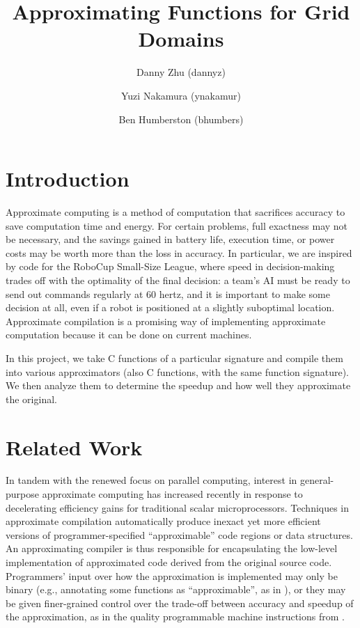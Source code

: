 \documentclass{article}
\begin{document}
\title{Approximating Functions for Grid Domains}
\author{Danny Zhu (dannyz) \and Yuzi Nakamura (ynakamur) \and Ben Humberston (bhumbers)}

\maketitle

\section{Introduction}

Approximate computing is a method of computation that sacrifices accuracy to save computation time and energy. For certain problems, full exactness may not be necessary, and the savings gained in battery life, execution time, or power costs may be worth more than the loss in accuracy. In particular, we are inspired by code for the RoboCup Small-Size League, where speed in decision-making trades off with the optimality of the final decision: a team's AI must be ready to send out commands regularly at 60 hertz, and it is important to make some decision at all, even if a robot is positioned at a slightly suboptimal location. Approximate compilation is a promising way of implementing approximate computation because it can be done on current machines.

In this project, we take  C functions of a particular signature and compile them into various approximators (also C functions, with the same function signature). We then analyze them to determine the speedup and how well they approximate the original.

\section{Related Work}
In tandem with the renewed focus on parallel computing, interest in general-purpose approximate computing has increased recently in response to decelerating efficiency gains for traditional scalar microprocessors. Techniques in approximate compilation automatically produce inexact yet more efficient versions of programmer-specified ``approximable'' code regions or data structures. An approximating compiler is thus responsible for encapsulating the low-level implementation of approximated code derived from the original source code. Programmers' input over how the approximation is implemented may only be binary (e.g., annotating some functions as ``approximable'', as in \cite{Esmaeilzadeh12}), or they may be given finer-grained control over the trade-off between accuracy and speedup of the approximation, as in the quality programmable machine instructions from \cite{Venkataramani13}.
\end{document}
